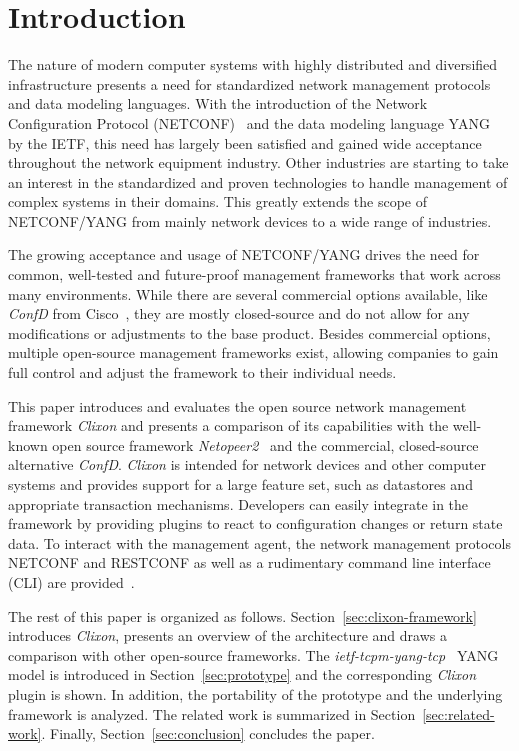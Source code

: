 \section{Introduction}
\label{sec:introduction}

The nature of modern computer systems with highly distributed and diversified infrastructure presents a need for standardized network management protocols and data modeling languages. With the introduction of the Network Configuration Protocol (NETCONF)~\cite{RFC6241} and the data modeling language YANG~\cite {RFC7950} by the IETF, this need has largely been satisfied and gained wide acceptance throughout the network equipment industry. Other industries are starting to take an interest in the standardized and proven technologies to handle management of complex systems in their domains. This greatly extends the scope of NETCONF/YANG from mainly network devices to a wide range of industries.

The growing acceptance and usage of NETCONF/YANG drives the need for common, well-tested and future-proof management frameworks that work across many environments. While there are several commercial options available, like \textit{ConfD} from Cisco~\cite{confd}, they are mostly closed-source and do not allow for any modifications or adjustments to the base product. Besides commercial options, multiple open-source management frameworks exist, allowing companies to gain full control and adjust the framework to their individual needs.

This paper introduces and evaluates the open source network management framework \textit{Clixon} and presents a comparison of its capabilities with the well-known open source framework \textit{Netopeer2}~\cite{netopeer2} and the commercial, closed-source alternative \textit{ConfD}. \textit{Clixon} is intended for network devices and other computer systems and provides support for a large feature set, such as datastores and appropriate transaction mechanisms. Developers can easily integrate in the framework by providing plugins to react to configuration changes or return state data. To interact with the management agent, the network management protocols NETCONF and RESTCONF as well as a rudimentary command line interface (CLI) are provided~\cite{clixon-documentation}.

The rest of this paper is organized as follows. Section~\ref{sec:clixon-framework} introduces \textit{Clixon}, presents an overview of the architecture and draws a comparison with other open-source frameworks. The \textit{ietf-tcpm-yang-tcp}~\cite{draft-ietf-tcpm-yang-tcp} YANG model is introduced in Section~\ref{sec:prototype} and the corresponding \textit{Clixon} plugin is shown. In addition, the portability of the prototype and the underlying framework is analyzed. The related work is summarized in Section~\ref{sec:related-work}. Finally, Section~\ref{sec:conclusion} concludes the paper.